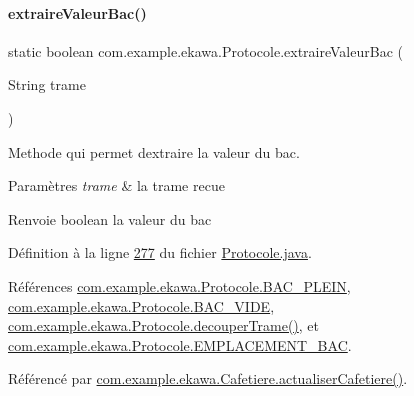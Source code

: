 \paragraph{\texorpdfstring{extraire\+Valeur\+Bac()}{extraireValeurBac()}}
{\footnotesize\ttfamily static boolean com.\+example.\+ekawa.\+Protocole.\+extraire\+Valeur\+Bac (\begin{DoxyParamCaption}\item[{String}]{trame }\end{DoxyParamCaption})\hspace{0.3cm}{\ttfamily [static]}}



Methode qui permet d\textquotesingle{}extraire la valeur du bac. 


\begin{DoxyParams}{Paramètres}
{\em trame} & la trame recue \\
\hline
\end{DoxyParams}
\begin{DoxyReturn}{Renvoie}
boolean la valeur du bac 
\end{DoxyReturn}


Définition à la ligne \hyperlink{_protocole_8java_source_l00277}{277} du fichier \hyperlink{_protocole_8java_source}{Protocole.\+java}.



Références \hyperlink{_protocole_8java_source_l00051}{com.\+example.\+ekawa.\+Protocole.\+B\+A\+C\+\_\+\+P\+L\+E\+IN}, \hyperlink{_protocole_8java_source_l00052}{com.\+example.\+ekawa.\+Protocole.\+B\+A\+C\+\_\+\+V\+I\+DE}, \hyperlink{_protocole_8java_source_l00208}{com.\+example.\+ekawa.\+Protocole.\+decouper\+Trame()}, et \hyperlink{_protocole_8java_source_l00050}{com.\+example.\+ekawa.\+Protocole.\+E\+M\+P\+L\+A\+C\+E\+M\+E\+N\+T\+\_\+\+B\+AC}.



Référencé par \hyperlink{_cafetiere_8java_source_l00543}{com.\+example.\+ekawa.\+Cafetiere.\+actualiser\+Cafetiere()}.


